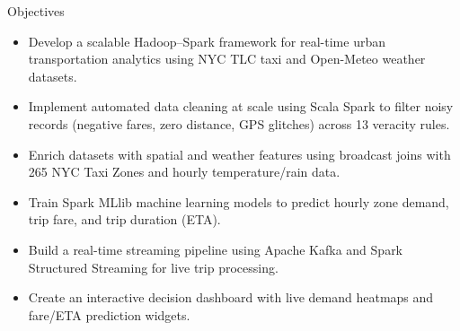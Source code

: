 \documentclass[aspectratio=169]{beamer}
\begin{document}
\begin{frame}{Objectives}
  \begin{itemize}
    \item Develop a scalable Hadoop--Spark framework for real-time urban transportation analytics using NYC TLC taxi and Open-Meteo weather datasets.
    \item Implement automated data cleaning at scale using Scala Spark to filter noisy records (negative fares, zero distance, GPS glitches) across 13 veracity rules.
    \item Enrich datasets with spatial and weather features using broadcast joins with 265 NYC Taxi Zones and hourly temperature/rain data.
    \item Train Spark MLlib machine learning models to predict hourly zone demand, trip fare, and trip duration (ETA).
    \item Build a real-time streaming pipeline using Apache Kafka and Spark Structured Streaming for live trip processing.
    \item Create an interactive decision dashboard with live demand heatmaps and fare/ETA prediction widgets.
  \end{itemize}
\end{frame}
\end{document}
